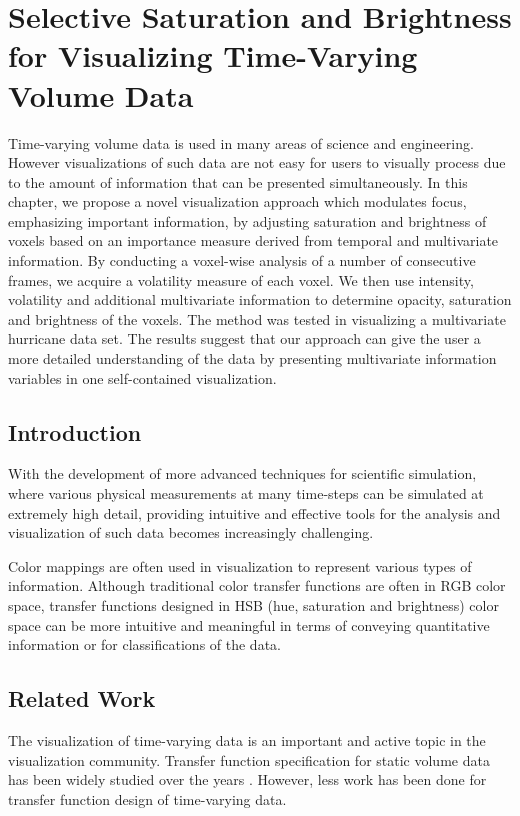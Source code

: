 \chapter{Selective Saturation and Brightness for Visualizing Time-Varying Volume Data}
Time-varying volume data is used in many areas of science and engineering. However visualizations of such data are not easy for users to visually process due to the amount of information that can be presented simultaneously. In this chapter, we propose a novel visualization approach which modulates focus, emphasizing important information, by adjusting saturation and brightness of voxels based on an importance measure derived from temporal and multivariate information. By conducting a voxel-wise analysis of a number of consecutive frames, we acquire a volatility measure of each voxel. We then use intensity, volatility and additional multivariate information to determine opacity, saturation and brightness of the voxels. The method was tested in visualizing a multivariate hurricane data set. The results suggest that our approach can give the user a more detailed understanding of the data by presenting multivariate information variables in one self-contained visualization.

\section{Introduction}
With the development of more advanced techniques for scientific simulation, where various physical measurements at many time-steps can be simulated at extremely high detail, providing intuitive and effective tools for the analysis and visualization of such data becomes increasingly challenging.

Color mappings are often used in visualization to represent various types of information. Although traditional color transfer functions are often in RGB color space, transfer functions designed in HSB (hue, saturation and brightness) color space can be more intuitive and meaningful in terms of conveying quantitative information or for classifications of the data.
\section{Related Work}
The visualization of time-varying data is an important and active topic in the visualization community. Transfer function specification for static volume data has been widely studied over the years \cite{pfister_transfer_2001}. However, less work has been done for transfer function design of time-varying data.

